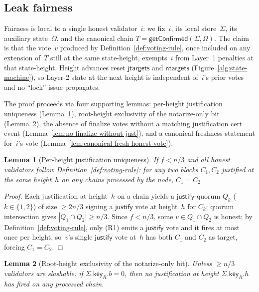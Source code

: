 \ifx\litemode\undefined\documentclass{article}\fi
\newcommand{\just}{\ensuremath{\mathsf{justify}}\xspace}
\newcommand{\jtargets}{\mathsf{jtargets}}
\newcommand{\ntargets}{\mathsf{ntargets}}
\newcommand{\key}{\mathsf{key}}
\newcommand{\getConfirmed}{\textsf{getConfirmed}\xspace}
\theoremstyle{plain}
\newtheorem{lemma}{Lemma}
\theoremstyle{definition}
\theoremstyle{remark}
\begin{document}
\subsection{Leak fairness}

Fairness is local to a single honest validator~$i$: we fix~$i$, its local store~$\Sigma$, its auxiliary state~$\Omega$, and the canonical chain $T = \getConfirmed(\Sigma, \Omega)$.
The claim is that the vote~$v$ produced by Definition~\ref{def:voting-rule}, once included on any extension of~$T$ still at the same state-height, exempts~$i$ from Layer~1 penalties at that state-height.
Height advances reset $\jtargets$ and $\ntargets$ (Figure~\ref{alg:state-machine}), so Layer-2 state at the next height is independent of~$i$'s prior votes and no ``lock'' issue propagates.

The proof proceeds via four supporting lemmas: per-height justification uniqueness (Lemma~\ref{lem:just-unique-height}), root-height exclusivity of the notarize-only bit (Lemma~\ref{lem:root-h-notarize-only}), the absence of finalize votes without a matching justification cert event (Lemma~\ref{lem:no-finalize-without-just}), and a canonical-freshness statement for~$i$'s vote (Lemma~\ref{lem:canonical-fresh-honest-vote}).

\begin{lemma}[Per-height justification uniqueness]\label{lem:just-unique-height}
If $f < n/3$ and all honest validators follow Definition~\ref{def:voting-rule}: for any two blocks $C_1, C_2$ justified at the same height~$h$ on any chains processed by the node, $C_1 = C_2$.
\end{lemma}

\begin{proof}
Each justification at height~$h$ on a chain yields a \just-quorum $Q_k$ ($k \in \{1, 2\}$) of size $\geq 2n/3$ signing a \just vote at height~$h$ for $C_k$; quorum intersection gives $|Q_1 \cap Q_2| \geq n/3$.
Since $f < n/3$, some $v \in Q_1 \cap Q_2$ is honest; by Definition~\ref{def:voting-rule}, only (R1) emits a \just vote and it fires at most once per height, so~$v$'s single \just vote at~$h$ has both $C_1$ and $C_2$ as target, forcing $C_1 = C_2$.
\end{proof}

\begin{lemma}[Root-height exclusivity of the notarize-only bit]\label{lem:root-h-notarize-only}
Unless $\geq n/3$ validators are slashable: if $\Sigma.\key_R.b = 0$, then no justification at height $\Sigma.\key_R.h$ has fired on any processed chain.
\end{lemma}
\end{document}
